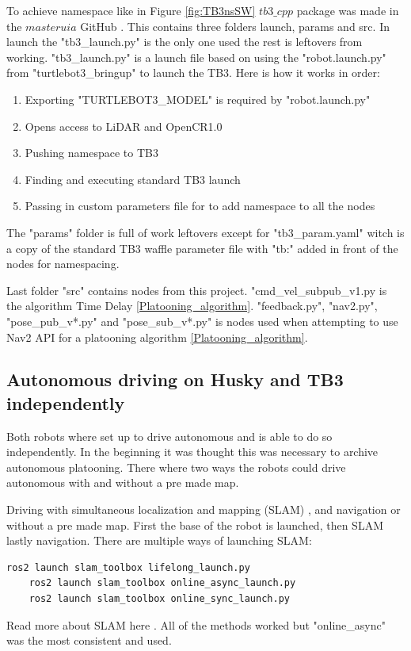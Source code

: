 To achieve namespace like in Figure \ref{fig:TB3nsSW} $tb3\_cpp$ package was made in the $masteruia$ GitHub \cite{masteruia}. This contains three folders launch, params and src. In launch the "tb3\_launch.py" is the only one used the rest is leftovers from working. "tb3\_launch.py" is  a launch file based on using the "robot.launch.py" from "turtlebot3\_bringup" \cite{turtlebot3galactic} to launch the TB3. Here is how it works in order: 
\begin{enumerate}
\item Exporting "TURTLEBOT3\_MODEL" is required by "robot.launch.py" 
\item Opens access to LiDAR and OpenCR1.0 
\item Pushing namespace to TB3 
\item Finding and executing standard TB3 launch
\item Passing in custom parameters file for to add namespace to all the nodes 
\end{enumerate}  

The "params" folder is full of work leftovers except for "tb3\_param.yaml" witch is a copy of the standard TB3 waffle parameter file with "tb:" added in front of the nodes for namespacing.

Last folder "src" contains nodes from this project. "cmd\_vel\_subpub\_v1.py is the algorithm Time Delay \ref{Platooning_algorithm}. "feedback.py", "nav2.py", "pose\_pub\_v*.py" and "pose\_sub\_v*.py" is nodes used when attempting to use Nav2 API for a platooning algorithm \ref{Platooning_algorithm}.

\subsection{Autonomous driving on Husky and TB3 independently}
Both robots where set up to drive autonomous and is able to do so independently. In the beginning it was thought this was necessary to archive autonomous platooning. There where two ways the robots could drive autonomous with and without a pre made map. 

Driving with simultaneous localization and mapping (SLAM) , and navigation or without a pre made map. First the base of the robot is launched, then SLAM lastly navigation. There are multiple ways of launching SLAM: 
\begin{lstlisting}[language=bash]
    ros2 launch slam_toolbox lifelong_launch.py 
    ros2 launch slam_toolbox online_async_launch.py
    ros2 launch slam_toolbox online_sync_launch.py
\end{lstlisting}
Read more about SLAM here \cite{slamtoolboxgithub}. All of the methods worked but "online\_async" was the most consistent and used. 

